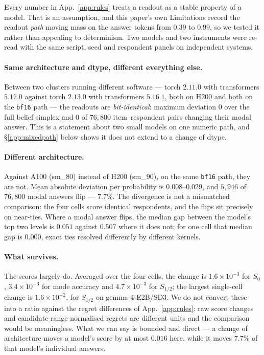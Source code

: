 \documentclass[11pt]{article}
\begin{document}
Every number in App.~\ref{app:rules} treats a readout as a stable property of a
model. That is an assumption, and this paper's own Limitations record the
readout \emph{path} moving mass on the answer tokens from $0.39$ to $0.99$, so
we tested it rather than appealing to determinism. Two models and two
instruments were re-read with the same script, seed and respondent panels on
independent systems.

\paragraph{Same architecture and dtype, different everything else.} Between two
clusters running different software --- torch $2.11.0$ with transformers
$5.17.0$ against torch $2.13.0$ with transformers $5.16.1$, both on H200 and
both on the \texttt{bf16} path --- the readouts are \emph{bit-identical}:
maximum deviation $0$ over the full belief simplex and $0$ of $76{,}800$
item--respondent pairs changing their modal answer. This is a statement about
two small models on one numeric path, and \S\ref{app:mixedpath} below shows it
does not extend to a change of dtype.

\paragraph{Different architecture.} Against A100 (sm\_80) instead of H200
(sm\_90), on the same \texttt{bf16} path, they are not. Mean absolute deviation
per probability is $0.008$--$0.029$, and $5{,}946$ of $76{,}800$ modal answers
flip --- $7.7\%$. The divergence is not a mismatched comparison: the four cells
score identical respondents, and the flips sit precisely on near-ties. Where a
modal answer flips, the median gap between the model's top two levels is
$0.051$ against $0.507$ where it does not; for one cell that median gap is
$0.000$, exact ties resolved differently by different kernels.

\paragraph{What survives.} The scores largely do. Averaged over the four
cells, the change is $1.6\times10^{-3}$ for $S_0$, $3.4\times10^{-3}$ for mode
accuracy and $4.7\times10^{-3}$ for $S_{1/2}$; the largest single-cell change
is $1.6\times10^{-2}$, for $S_{1/2}$ on gemma-4-E2B/SD3. We do not convert
these into a ratio against the regret differences of App.~\ref{app:rules}: raw
score changes and candidate-range-normalised regrets are different units and
the comparison would be meaningless. What we can say is bounded and direct ---
a change of architecture moves a model's score by at most $0.016$ here, while
it moves $7.7\%$ of that model's individual answers.
\end{document}
